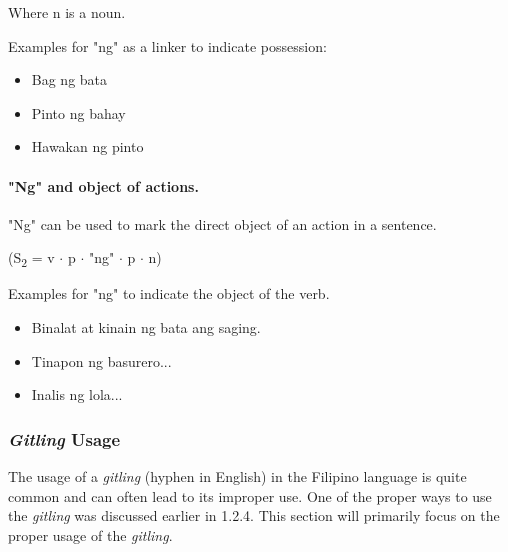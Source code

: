 Where n is a noun. \\

\begin{example}
      Examples for "ng" as a linker to indicate possession:
\end{example}
\begin{itemize}
      \item Bag ng bata
      \item Pinto ng bahay
      \item Hawakan ng pinto
\end{itemize}

\paragraph{"Ng" and object of actions.}"Ng" can be used to mark the direct object
of an action in a sentence.
\begin{center}
      (S\textsubscript{2} = v \(\cdot\) p \(\cdot\) "ng" \(\cdot\) p \(\cdot\) n)
\end{center}

\begin{example}
      Examples for "ng" to indicate the object of the verb.
\end{example}
\begin{itemize}
      \item Binalat at kinain ng bata ang saging.
      \item Tinapon ng basurero...
      \item Inalis ng lola...
\end{itemize}

\subsubsection{\textit{Gitling} Usage}
The usage of a \textit{gitling} (hyphen in English) in the Filipino language is quite common and can often lead to its improper use. One of the proper ways to use the \textit{gitling} was discussed earlier in 1.2.4. This section will primarily focus on the proper usage of the \textit{gitling}.

